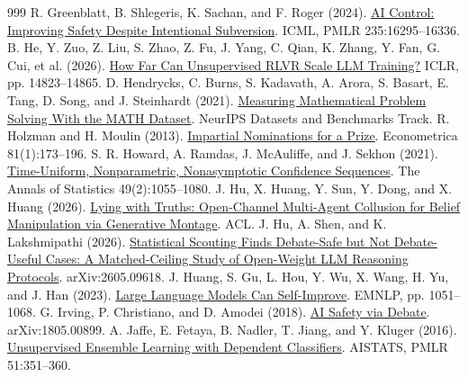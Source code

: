 \documentclass[12pt,letterpaper]{article}
\begin{document}
\begin{thebibliography}{999}
 R. Greenblatt, B. Shlegeris, K. Sachan, and F. Roger (2024). \href{https://arxiv.org/abs/2312.06942}{AI Control: Improving Safety Despite Intentional Subversion}. ICML, PMLR 235:16295--16336.
 B. He, Y. Zuo, Z. Liu, S. Zhao, Z. Fu, J. Yang, C. Qian, K. Zhang, Y. Fan, G. Cui, et al. (2026). \href{https://proceedings.iclr.cc/paper_files/paper/2026/hash/18929f3253e4d4e28086a89ab88d1276-Abstract-Conference.html}{How Far Can Unsupervised RLVR Scale LLM Training?} ICLR, pp. 14823--14865.
 D. Hendrycks, C. Burns, S. Kadavath, A. Arora, S. Basart, E. Tang, D. Song, and J. Steinhardt (2021). \href{https://datasets-benchmarks-proceedings.neurips.cc/paper/2021/hash/be83ab3ecd0db773eb2dc1b0a17836a1-Abstract-round2.html}{Measuring Mathematical Problem Solving With the MATH Dataset}. NeurIPS Datasets and Benchmarks Track.
 R. Holzman and H. Moulin (2013). \href{https://doi.org/10.3982/ECTA10523}{Impartial Nominations for a Prize}. Econometrica 81(1):173--196.
 S. R. Howard, A. Ramdas, J. McAuliffe, and J. Sekhon (2021). \href{https://doi.org/10.1214/20-AOS1991}{Time-Uniform, Nonparametric, Nonasymptotic Confidence Sequences}. The Annals of Statistics 49(2):1055--1080.
 J. Hu, X. Huang, Y. Sun, Y. Dong, and X. Huang (2026). \href{https://arxiv.org/abs/2601.01685}{Lying with Truths: Open-Channel Multi-Agent Collusion for Belief Manipulation via Generative Montage}. ACL.
 J. Hu, A. Shen, and K. Lakshmipathi (2026). \href{https://arxiv.org/abs/2605.09618}{Statistical Scouting Finds Debate-Safe but Not Debate-Useful Cases: A Matched-Ceiling Study of Open-Weight LLM Reasoning Protocols}. arXiv:2605.09618.
 J. Huang, S. Gu, L. Hou, Y. Wu, X. Wang, H. Yu, and J. Han (2023). \href{https://doi.org/10.18653/v1/2023.emnlp-main.67}{Large Language Models Can Self-Improve}. EMNLP, pp. 1051--1068.
 G. Irving, P. Christiano, and D. Amodei (2018). \href{https://arxiv.org/abs/1805.00899}{AI Safety via Debate}. arXiv:1805.00899.
 A. Jaffe, E. Fetaya, B. Nadler, T. Jiang, and Y. Kluger (2016). \href{https://proceedings.mlr.press/v51/jaffe16.html}{Unsupervised Ensemble Learning with Dependent Classifiers}. AISTATS, PMLR 51:351--360.

\end{thebibliography}
\end{document}
